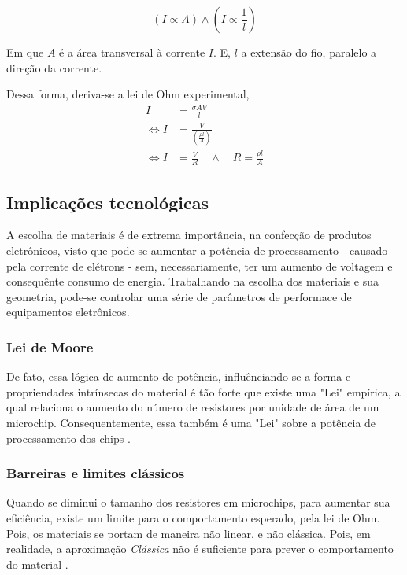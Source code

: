 \documentclass[11pt]{article}
\begin{document}
\begin{equation}
\label{eq:IV}
(I \propto A) \land (I \propto \frac{1}{l})
\end{equation}

Em que \(A\) é a área transversal à corrente \(I\). E, \(l\) a extensão do fio, paralelo a direção da corrente.

Dessa forma, deriva-se a lei de Ohm experimental,
\begin{equation}
  \begin{aligned}
  I &= \frac{\sigma A V}{l} \\
    \Leftrightarrow I &= \frac{V}{(\frac{\rho l}{A})}\\
    \Leftrightarrow I &= \frac{V}{R} \quad \land \quad R = \frac{\rho l}{A} 
  \end{aligned}
\end{equation}

\subsection{Implicações tecnológicas}
\label{sec:orgb9b70b1}
A escolha de materiais é de extrema importância, na confecção de produtos eletrônicos, visto que pode-se aumentar a potência de processamento  - causado pela corrente de elétrons - sem, necessariamente, ter um aumento de voltagem e consequênte consumo de energia. Trabalhando na escolha dos materiais e sua geometria, pode-se controlar uma série de parâmetros de performace de equipamentos eletrônicos.

\subsubsection{Lei de Moore}
\label{sec:org7257ec3}
De fato, essa lógica de aumento de potência, influênciando-se a forma e propriendades intrínsecas do material é tão forte que existe uma "Lei" empírica, a qual relaciona o aumento do número de resistores por unidade de área de um microchip. Consequentemente, essa também é uma "Lei" sobre a potência de processamento dos chips \cite{moore2012computing}.

\subsubsection{Barreiras e limites clássicos}
\label{sec:org3d1d2fb}
Quando se diminui o tamanho dos resistores em microchips, para aumentar sua eficiência, existe um limite para o comportamento esperado, pela lei de Ohm. Pois, os materiais se portam de maneira não linear, e não clássica. Pois, em realidade, a aproximação \textit{Clássica} não é suficiente para prever o comportamento do material \cite{moore2012computing}.
\end{document}
